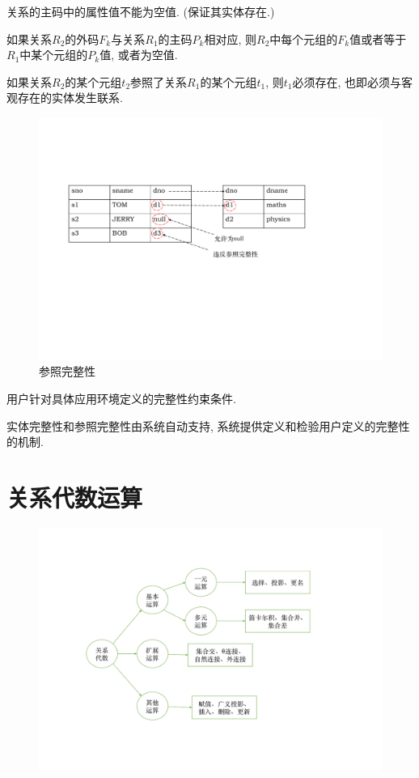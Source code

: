 \begin{definition}[实体完整性]
关系的主码中的属性值不能为空值. (保证其实体存在.)
\end{definition}

\begin{definition}[参照完整性]
如果关系$R_2$的外码$F_k$与关系$R_1$的主码$P_k$相对应, 
则$R_2$中每个元组的$F_k$值或者等于$R_1$中某个元组的$P_k$值, 或者为空值.

如果关系$R_2$的某个元组$t_2$参照了关系$R_1$的某个元组$t_1$, 则$t_1$必须存在, 
也即必须与客观存在的实体发生联系.
\end{definition}

\begin{figure}[H]
    \centering
    \includegraphics[width=.6\textwidth]{./figure/参照完整性.pdf}
    \caption{参照完整性}
\end{figure}

\begin{definition}[用户完整性]
用户针对具体应用环境定义的完整性约束条件.
\end{definition}

实体完整性和参照完整性由系统自动支持, 系统提供定义和检验用户定义的完整性的机制.

\section{关系代数运算}

\begin{figure}[H]
    \centering
    \includegraphics[width=.6\textwidth]{./figure/关系代数.pdf}
\end{figure}

